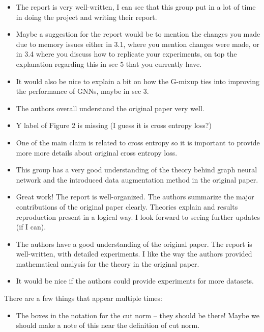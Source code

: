 \documentclass{amsart}
\begin{document}
\begin{itemize}
    \item The report is very well-written, I can see that this group put in a lot of time in doing the project and writing their report. 
    
    \item Maybe a suggestion for the report would be to mention the changes you made due to memory issues either in 3.1, where you mention changes were made, or in 3.4 where you discuss how to replicate your experiments, on top the explanation regarding this in sec 5 that you currently have. 
    
    \item It would also be nice to explain a bit on how the G-mixup ties into improving the performance of GNNs, maybe in sec 3.

    \item The authors overall understand the original paper very well. 
    
    \item Y label of Figure 2 is missing (I guess it is cross entropy loss?) 
    
    \item One of the main claim is related to cross entropy so it is important to provide more more details about original cross entropy loss.

    \item This group has a very good understanding of the theory behind graph neural network and the introduced data augmentation method in the original paper.

    \item Great work! The report is well-organized. The authors summarize the major contributions of the original paper clearly. Theories explain and results reproduction present in a logical way. I look forward to seeing further updates (if I can).

    \item The authors have a good understanding of the original paper. The report is well-written, with detailed experiments. I like the way the authors provided mathematical analysis for the theory in the original paper. 
    
    \item It would be nice if the authors could provide experiments for more datasets.
\end{itemize}

There are a few things that appear multiple times:
\begin{itemize}
    \item The boxes in the notation for the cut norm -- they should be there! Maybe we should make a note of this near the definition of cut norm.
\end{itemize}
\end{document}
